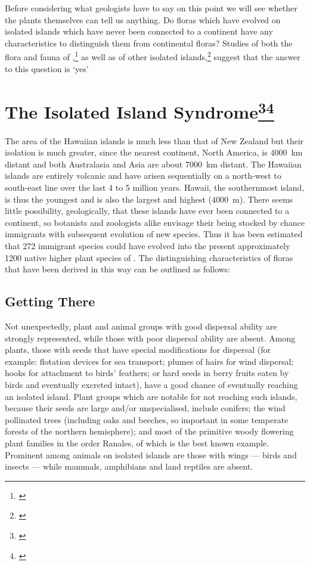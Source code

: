 Before considering what geologists have to say on this point we will see whether the plants themselves can tell us anything.
Do floras which have evolved on isolated islands which have never been connected to a continent have any characteristics to distinguish them from continental floras? Studies of both the flora and fauna of ,\footnote{\cite{carlquist1970hawaii}} as well as of other isolated islands,\footnote{\cite{carlquist1965island}} suggest that the answer to this question is `yes'

\section[The Isolated Island Syndrome]{The Isolated Island Syndrome\thinspace\footnote{\cite{ehrendorfer1979reproductive}}\footnote{\cite{lloyd1985progress}}}

The area of the Hawaiian islands is much less than that of New Zealand but their isolation is much greater, since the nearest continent, North America, is \SI{4000}{\kilo\metre} distant and both Australasia and Asia are about \SI{7000}{\kilo\metre} distant.
The Hawaiian islands are entirely volcanic and have arisen sequentially on a north-west to south-east line over the last 4 to 5 million years.
Hawai{\okina}i, the southernmost island, is thus the youngest and is also the largest and highest (\SI{4000}{\metre}).
There seems little possibility, geologically, that these islands have ever been connected to a continent, so botanists and zoologists alike envisage their being stocked by chance immigrants with subsequent evolution of new species.
Thus it has been estimated that 272 immigrant species could have evolved into the present approximately 1200 native higher plant species of .
The distinguishing characteristics of floras that have been derived in this way can be outlined as follows:

\subsection{Getting There}

Not unexpectedly, plant and animal groups with good dispersal ability are strongly represented, while those with poor dispersal ability are absent.
Among plants, those with seeds that have special modifications for dispersal (for example: flotation devices for sea transport; plumes of hairs for wind dispersal; hooks for attachment to birds' feathers; or hard seeds in berry fruits eaten by birds and eventually excreted intact), have a good chance of eventually reaching an isolated island.
Plant groups which are notable for not reaching such islands, because their seeds are large and/or unspecialised, include conifers; the wind pollinated trees (including oaks and beeches, so important in some temperate forests of the northern hemisphere); and most of the primitive woody flowering plant families in the order Ranales, of which  is the best known example.
Prominent among animals on isolated islands are those with wings --- birds and insects --- while mammals, amphibians and land reptiles are absent.

